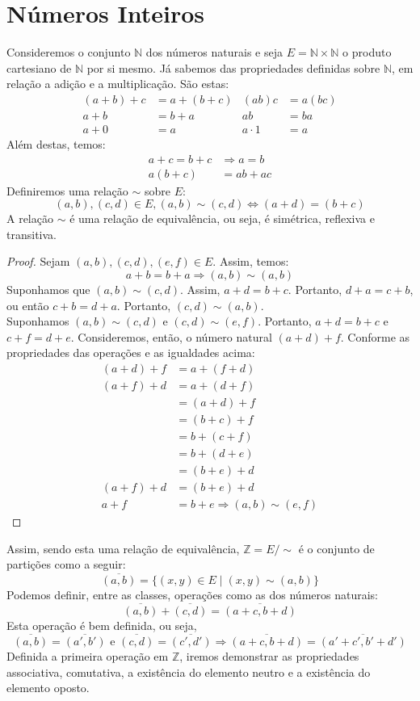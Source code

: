 \section{Números Inteiros}
Consideremos o conjunto $\mathbb{N}$ dos números naturais e seja $E = \mathbb{N} \times \mathbb{N}$ o produto cartesiano de $\mathbb{N}$ por si mesmo. Já sabemos das propriedades definidas sobre $\mathbb{N}$, em relação a adição e a multiplicação. São estas:
\begin{align*}
(a+b)+c&=a+(b+c)& (ab)c&=a(bc)\\
a+b&=b+a& ab&=ba\\
a+0&=a& a\cdot 1&=a
\end{align*}
Além destas, temos:
\begin{align*}
a+c=b+c &\Rightarrow a=b\\
a(b+c)&=ab+ac
\end{align*}
Definiremos uma relação $\sim$ sobre $E$:
\[(a,b),(c,d) \in E, (a,b)\sim (c,d) \Leftrightarrow (a+d)=(b+c)\]
A relação $\sim$ é uma relação de equivalência, ou seja, é simétrica, reflexiva e transitiva.
\begin{proof}
Sejam $(a,b),(c,d),(e,f) \in E$. Assim, temos:
\[a+b=b+a \Rightarrow (a,b)\sim (a,b)\]
Suponhamos que $(a,b) \sim (c,d)$. Assim, $a+d=b+c$. Portanto, $d+a=c+b$, ou então $c+b=d+a$. Portanto, $(c,d)\sim (a,b)$. \\
Suponhamos $(a,b) \sim (c,d)$ e $(c,d) \sim (e,f)$. Portanto, $a+d=b+c$ e $c+f=d+e$. Consideremos, então, o número natural $(a+d)+f$. Conforme as propriedades das operações e as igualdades acima:
\begin{align*}
(a+d)+f &= a+(f+d) \\
(a+f)+d &= a+(d+f) \\
&= (a+d)+f \\
&= (b+c)+f \\
&= b+(c+f) \\
&= b+(d+e) \\
&= (b+e)+d \\
(a+f)+d &=(b+e)+d\\
a+f&=b+e \Rightarrow (a,b)\sim(e,f)
\end{align*}
\end{proof}
Assim, sendo esta uma relação de equivalência, $\mathbb{Z}=E/\sim$ é o conjunto de partições como a seguir:
\[\overline{(a,b)}=\{(x,y) \in E \mid (x,y) \sim (a,b)\}\]
Podemos definir, entre as classes, operações como as dos números naturais:
\[\overline{(a,b)} +\overline{(c,d)}= \overline{(a+c,b+d)}\]
Esta operação é bem definida, ou seja, \[\overline{(a,b)}=\overline{(a',b')} \textrm{ e } \overline{(c,d)}=\overline{(c',d')} \Rightarrow \overline{(a+c,b+d)}=\overline{(a'+c',b'+d')}\]
Definida a primeira operação em $\mathbb{Z}$, iremos demonstrar as propriedades associativa, comutativa, a existência do elemento neutro e a existência do elemento oposto.

